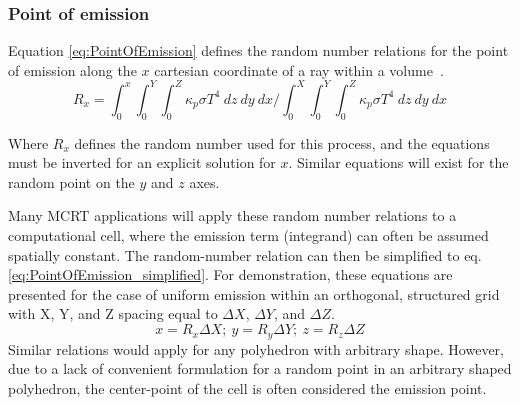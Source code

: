 \subsubsection{Point of emission}
Equation \ref{eq:PointOfEmission} defines the random number relations for the point of emission along the $x$ cartesian coordinate of a ray within a volume~\cite{Modest2013RadiativeTransferb}.
\begin{equation}
    R_x=\int^x_0{\int^Y_0{\int^Z_0{\kappa{}_p\sigma{}T^4~dz}~dy}~dx}/\int^X_0{\int^Y_0{\int^Z_0{\kappa{}_p\sigma{}T^4~dz}~dy}~dx}
    \label{eq:PointOfEmission}
\end{equation}

Where $R_x$ defines the random number used for this process, and the equations must be inverted for an explicit solution for $x$. Similar equations will exist for the random point on the $y$ and $z$ axes.

Many MCRT applications will apply these random number relations to a computational cell, where the emission term (integrand) can often be assumed spatially constant. 
The random-number relation can then be simplified to eq. \ref{eq:PointOfEmission_simplified}. For demonstration, these equations are presented for the case of uniform emission within an orthogonal, structured grid with X, Y, and Z spacing equal to $\Delta{}X$, $\Delta{}Y$, and $\Delta{}Z$. 
\begin{equation}
    x = R_x\Delta{X};~ y = R_y\Delta{Y};~z = R_z\Delta{Z}
    \label{eq:PointOfEmission_simplified}
\end{equation}
Similar relations would apply for any polyhedron with arbitrary shape. However, due to a lack of convenient formulation for a random point in an arbitrary shaped polyhedron, the center-point of the cell is often considered the emission point.

